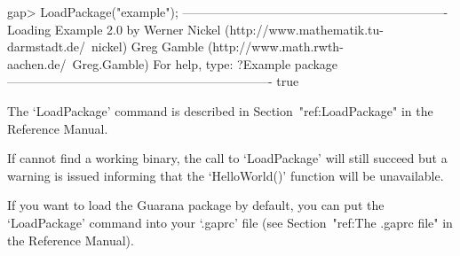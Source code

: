 \beginexample
gap> LoadPackage("example");
----------------------------------------------------------------
Loading  Example 2.0
by Werner Nickel (http://www.mathematik.tu-darmstadt.de/~nickel)
   Greg Gamble (http://www.math.rwth-aachen.de/~Greg.Gamble)
For help, type: ?Example package 
----------------------------------------------------------------
true
\endexample

The `LoadPackage' command is described  in  Section~"ref:LoadPackage"  in
the {\GAP} Reference Manual.

If {\GAP} cannot find a working binary, the call  to  `LoadPackage'  will
still succeed but a warning is issued informing that  the  `HelloWorld()'
function will be unavailable.

If you want to load the {Guarana} package by default, you  can  put  the
`LoadPackage' command  into  your  `.gaprc'  file  (see  Section~"ref:The
.gaprc file" in the {\GAP} Reference Manual).

